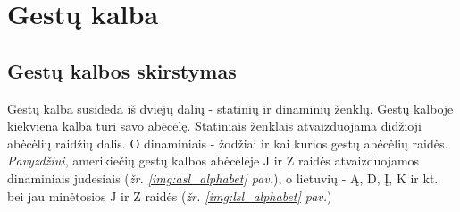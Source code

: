 \documentclass{VUMIFInfKursinis}
\begin{document}
\section{Gestų kalba}
\subsection{Gestų kalbos skirstymas}
Gestų kalba susideda iš dviejų dalių - statinių ir dinaminių ženklų. Gestų kalboje kiekviena kalba turi savo abėcėlę. Statiniais ženklais atvaizduojama didžioji abėcėlių raidžių dalis. O dinaminiais - žodžiai ir kai kurios gestų abėcėlių raidės. \textit{Pavyzdžiui}, amerikiečių gestų kalbos abėcėlėje J ir Z raidės atvaizduojamos dinaminiais judesiais (\textit{žr. \ref{img:asl_alphabet} pav.}), o lietuvių - Ą, D, Į, K ir kt. bei jau minėtosios J ir Z raidės (\textit{žr. \ref{img:lsl_alphabet} pav.})
\end{document}
